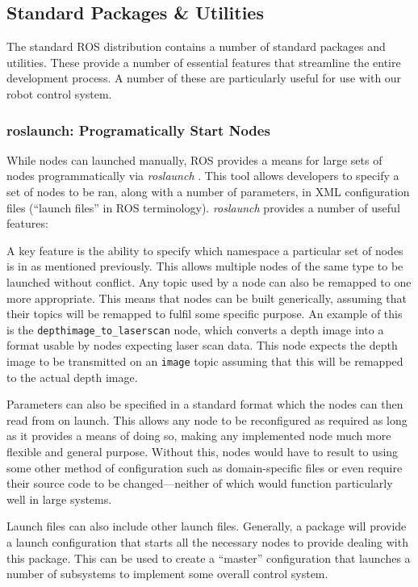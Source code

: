 \subsection{Standard Packages \& Utilities}
The standard ROS distribution contains a number of standard packages and utilities. These provide a number of essential features that streamline the entire development process. A number of these are particularly useful for use with our robot control system.

\subsubsection{roslaunch: Programatically Start Nodes}
While nodes can launched manually, ROS provides a means for large sets of nodes programmatically via \emph{roslaunch} \cite{ros_paper, ros_wiki_roslaunch}. This tool allows developers to specify a set of nodes to be ran, along with a number of parameters, in XML configuration files (``launch files'' in ROS terminology). \emph{roslaunch} provides a number of useful features:

A key feature is the ability to specify which namespace a particular set of nodes is in as mentioned previously. This allows multiple nodes of the same type to be launched without conflict. Any topic used by a node can also be remapped to one more appropriate. This means that nodes can be built generically, assuming that their topics will be remapped to fulfil some specific purpose. An example of this is the \texttt{depthimage\_to\_laserscan} node, which converts a depth image into a format usable by nodes expecting laser scan data. This node expects the depth image to be transmitted on an \texttt{image} topic assuming that this will be remapped to the actual depth image.

Parameters can also be specified in a standard format which the nodes can then read from on launch. This allows any node to be reconfigured as required as long as it provides a means of doing so, making any implemented node much more flexible and general purpose. Without this, nodes would have to result to using some other method of configuration such as domain-specific files or even require their source code to be changed---neither of which would function particularly well in large systems.

Launch files can also include other launch files. Generally, a package will provide a launch configuration that starts all the necessary nodes to provide dealing with this package. This can be used to create a ``master'' configuration that launches a number of subsystems to implement some overall control system.

